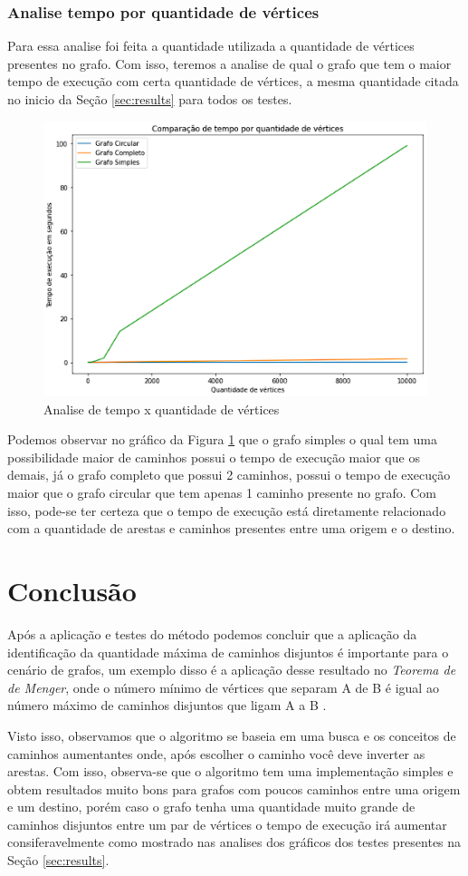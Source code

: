 \subsubsection{Analise tempo por quantidade de vértices}

Para essa analise foi feita a quantidade utilizada a quantidade de vértices presentes no grafo. Com isso, teremos a analise de qual o grafo que tem o maior tempo de execução com certa quantidade de vértices, a mesma quantidade citada no inicio da Seção \ref{sec:results} para todos os testes.

\begin{figure}[ht]
    \centering
    \includegraphics[width=.6\textwidth]{figuras/comparacao.png}
    \caption{Analise de tempo x quantidade de vértices}
    \label{fig:figure50}
\end{figure}

Podemos observar no gráfico da Figura \ref{fig:figure50} que o grafo simples o qual tem uma possibilidade maior de caminhos possui o tempo de execução maior que os demais, já o grafo completo que possui 2 caminhos, possui o tempo de execução maior que o grafo circular que tem apenas 1 caminho presente no grafo. Com isso, pode-se ter certeza que o tempo de execução está diretamente relacionado com a quantidade de arestas e caminhos presentes entre uma origem e o destino.

\section{Conclusão}
Após a aplicação e testes do método podemos concluir que a aplicação da identificação da quantidade máxima de caminhos disjuntos é importante para o cenário de grafos, um exemplo disso é a aplicação desse resultado no \textit{Teorema de de Menger}, onde o número mínimo de vértices que separam A de B é igual ao número máximo de caminhos disjuntos que ligam A a B \cite{SEYMOUR1980293}.

Visto isso, observamos que o algoritmo se baseia em uma busca e os conceitos de caminhos aumentantes onde, após escolher o caminho você deve inverter as arestas. Com isso, observa-se que o algoritmo tem uma implementação simples e obtem resultados muito bons para grafos com poucos caminhos entre uma origem e um destino, porém caso o grafo tenha uma quantidade muito grande de caminhos disjuntos entre um par de vértices o tempo de execução irá aumentar consiferavelmente como mostrado nas analises dos gráficos dos testes presentes na Seção \ref{sec:results}.